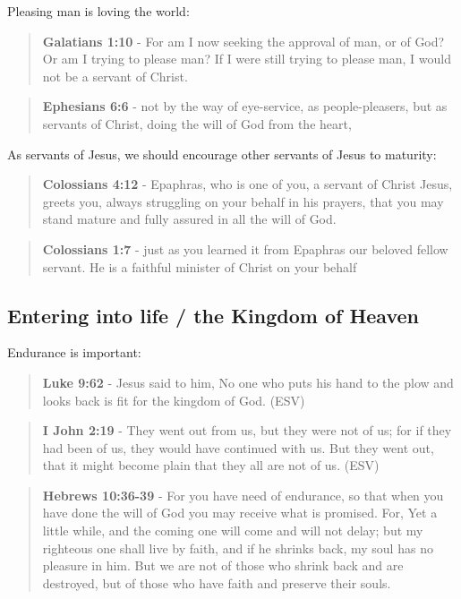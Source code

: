 \documentclass[11pt]{article}
\begin{document}
Pleasing man is loving the world:

\begin{quote}
\textbf{Galatians 1:10} - For am I now seeking the approval of man, or of God? Or am I trying to please man? If I were still trying to please man, I would not be a servant of Christ.
\end{quote}

\begin{quote}
\textbf{Ephesians 6:6} - not by the way of eye-service, as people-pleasers, but as servants of Christ, doing the will of God from the heart,
\end{quote}

As servants of Jesus, we should encourage other servants of Jesus to maturity:

\begin{quote}
\textbf{Colossians 4:12} - Epaphras, who is one of you, a servant of Christ Jesus, greets you, always struggling on your behalf in his prayers, that you may stand mature and fully assured in all the will of God.
\end{quote}

\begin{quote}
\textbf{Colossians 1:7} - just as you learned it from Epaphras our beloved fellow servant. He is a faithful minister of Christ on your behalf
\end{quote}

\subsection{Entering into life / the Kingdom of Heaven}
\label{sec:org839b690}
Endurance is important:

\begin{quote}
\textbf{Luke 9:62} - Jesus said to him, No one who puts his hand to the plow and looks back is fit for the kingdom of God. (ESV)
\end{quote}

\begin{quote}
\textbf{I John 2:19} - They went out from us, but they were not of us; for if they had been of us, they would have continued with us. But they went out, that it might become plain that they all are not of us. (ESV)
\end{quote}

\begin{quote}
\textbf{Hebrews 10:36-39} - For you have need of endurance, so that when you have done the will of God you may receive what is promised. For, Yet a little while, and the coming one will come and will not delay; but my righteous one shall live by faith, and if he shrinks back, my soul has no pleasure in him. But we are not of those who shrink back and are destroyed, but of those who have faith and preserve their souls.
\end{quote}
\end{document}
